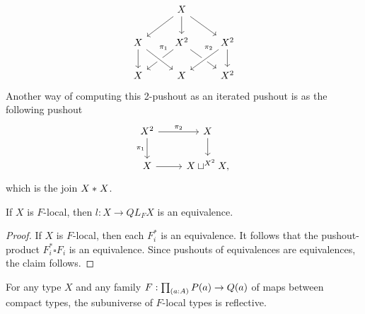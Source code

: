 \begin{eg}
\begin{equation*}
\begin{tikzcd}
& X \arrow[dl] \arrow[d] \arrow[dr] \\
X \arrow[d] & X^2 \arrow[dl,swap,"\pi_1" very near start] \arrow[dr] & X^2 \arrow[dl,crossing over,swap,"\pi_2" very near start] \arrow[d] \\
X & X \arrow[from=ul,crossing over] & X^2
\end{tikzcd}
\end{equation*}
Another way of computing this 2-pushout as an iterated pushout is as the following pushout
\begin{equation*}
\begin{tikzcd}
X^2 \arrow[r,"\pi_2"] \arrow[d,swap,"\pi_1"] & X \arrow[d] \\
X \arrow[r] & X\sqcup^{X^2} X,
\end{tikzcd}
\end{equation*}
which is the join ${X}\ast_{}{X}$.
\end{eg}

\begin{prp}
If $X$ is $F$-local, then $l:X\to QL_F X$ is an equivalence.
\end{prp}

\begin{proof}
If $X$ is $F$-local, then each $F_i^\ast$ is an equivalence. It follows that the pushout-product $F_i^\ast\square F_i$ is an equivalence. Since pushouts of equivalences are equivalences, the claim follows.
\end{proof}

\begin{thm}
For any type $X$ and any family $F:\prd{a:A}P(a)\to Q(a)$ of maps between
compact types, the subuniverse of $F$-local types is reflective.
\end{thm}


